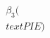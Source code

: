 \documentclass[preview]{standalone}
\begin{document}
\begin{align*}
\beta_3(\\text{PIE})
\end{align*}
\end{document}

